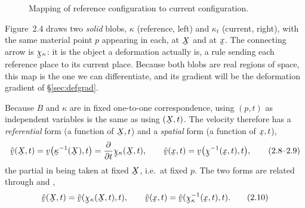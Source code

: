 \begin{figure}[htbp]\centering
{}
\caption{Mapping of reference configuration to current configuration.}\label{fig:2.4}
\end{figure}

\begin{remark}\label{rem:fig4}
Figure~2.4 draws two \emph{solid} blobs, $\kappa$ (reference, left) and
$\kappa_t$ (current, right), with the same material point $p$ appearing in
each, at $\bX$ and at $\bx$. The connecting arrow is $\bchi_\kappa$: it is
the object a deformation actually is, a rule sending each reference place to
its current place. Because both blobs are real regions of space, this map is
the one we can differentiate, and its gradient will be the deformation
gradient of \S\ref{sec:defgrad}.
\end{remark}

Because $B$ and $\kappa$ are in fixed one-to-one correspondence, using
$(p,t)$ as independent variables is the same as using $(\bX,t)$. The
velocity therefore has a \emph{referential} form (a function of $\bX,t$) and
a \emph{spatial} form (a function of $\bx,t$),
\begin{equation}
   \hat\bv(\bX,t)=\bv\big(\bkappa^{-1}(\bX),t\big)
   =\frac{\partial}{\partial t}\bchi_\kappa(\bX,t),\qquad
   \tilde\bv(\bx,t)=\bv\big(\bchi^{-1}(\bx,t),t\big), \tag{2.8--2.9}\label{eq:2.8}
\end{equation}
the partial in  being taken at fixed $\bX$, i.e.\ at fixed $p$. The
two forms are related through  and ,
\begin{equation}
   \hat\bv(\bX,t)=\tilde\bv(\bchi_\kappa(\bX,t),t),\qquad
   \tilde\bv(\bx,t)=\hat\bv(\bchi_\kappa^{-1}(\bx,t),t). \tag{2.10}\label{eq:2.10}
\end{equation}

